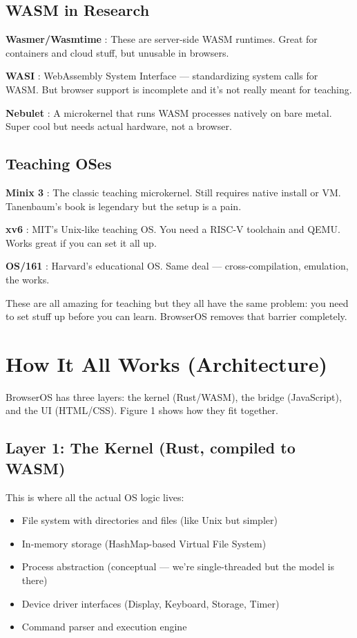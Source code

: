 \documentclass[conference]{IEEEtran}
\begin{document}
\subsection{WASM in Research}

\textbf{Wasmer/Wasmtime} \cite{wasmer2019}: These are server-side WASM runtimes. Great for containers and cloud stuff, but unusable in browsers.

\textbf{WASI} \cite{wasi2019}: WebAssembly System Interface — standardizing system calls for WASM. But browser support is incomplete and it's not really meant for teaching.

\textbf{Nebulet} \cite{nebulet2018}: A microkernel that runs WASM processes natively on bare metal. Super cool but needs actual hardware, not a browser.

\subsection{Teaching OSes}

\textbf{Minix 3} \cite{herder2006minix3}: The classic teaching microkernel. Still requires native install or VM. Tanenbaum's book is legendary but the setup is a pain.

\textbf{xv6} \cite{cox2011xv6}: MIT's Unix-like teaching OS. You need a RISC-V toolchain and QEMU. Works great if you can set it all up.

\textbf{OS/161} \cite{os161}: Harvard's educational OS. Same deal — cross-compilation, emulation, the works.

These are all amazing for teaching but they all have the same problem: you need to set stuff up before you can learn. BrowserOS removes that barrier completely.

\section{How It All Works (Architecture)}

BrowserOS has three layers: the kernel (Rust/WASM), the bridge (JavaScript), and the UI (HTML/CSS). Figure 1 shows how they fit together.

\subsection{Layer 1: The Kernel (Rust, compiled to WASM)}

This is where all the actual OS logic lives:

\begin{itemize}
    \item File system with directories and files (like Unix but simpler)
    \item In-memory storage (HashMap-based Virtual File System)
    \item Process abstraction (conceptual — we're single-threaded but the model is there)
    \item Device driver interfaces (Display, Keyboard, Storage, Timer)
    \item Command parser and execution engine
\end{itemize}
\end{document}
